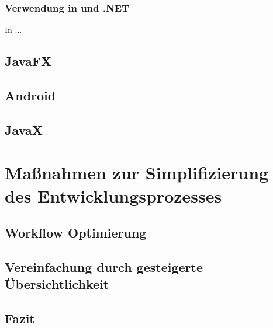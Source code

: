 \subsubsection{Verwendung in \texorpdfstring{\csharpbold}{C\#} und .NET}
In \csharp ... \cite{Albahari2019}
\label{verwendung_in_c_sharp_dot_net}
\subsection{JavaFX}
\label{aktuelle_verwendung_von_annotationen_javafx}


\subsection{Android}
\label{aktuelle_verwendung_von_annotationen_android}


\subsection{JavaX}
\label{aktuelle_verwendung_von_annotationen_javax}


\section{Maßnahmen zur Simplifizierung des Entwicklungsprozesses}
\label{maßnahmen_zur_simplifizierung_des_entwicklungsprozesses}


\subsection{Workflow Optimierung}
\label{maßnahmen_zur_simplifizierung_des_entwicklungsprozesses_workflow}


\subsection{Vereinfachung durch gesteigerte Übersichtlichkeit}
\label{maßnahmen_zur_simplifizierung_des_entwicklungsprozesses_übersichtichkeit}


\subsection{Fazit}
\label{maßnahmen_zur_simplifizierung_des_entwicklungsprozesses_fazit}


